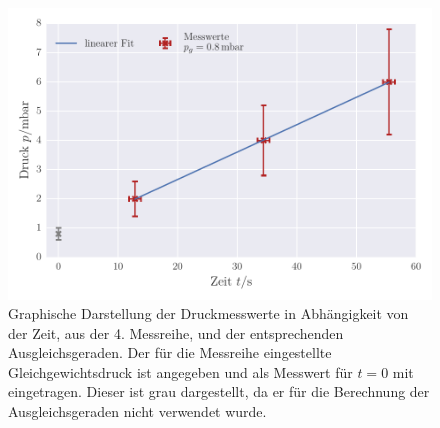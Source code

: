 \begin{figure}[!h]
 \centering
 \includegraphics[scale=0.8]{../Grafiken/Leckrate_Drehschieber_3.pdf}
 \caption{Graphische Darstellung der Druckmesswerte in Abhängigkeit von der Zeit, aus der 4. Messreihe, und der
 entsprechenden Ausgleichsgeraden. Der für die Messreihe eingestellte Gleichgewichtsdruck ist angegeben und als Messwert für $t=0$ mit eingetragen. Dieser ist grau dargestellt, da er für die 
 Berechnung der Ausgleichsgeraden nicht verwendet wurde. \label{fig:leckrate_drehschieber_3}}
 \end{figure} 